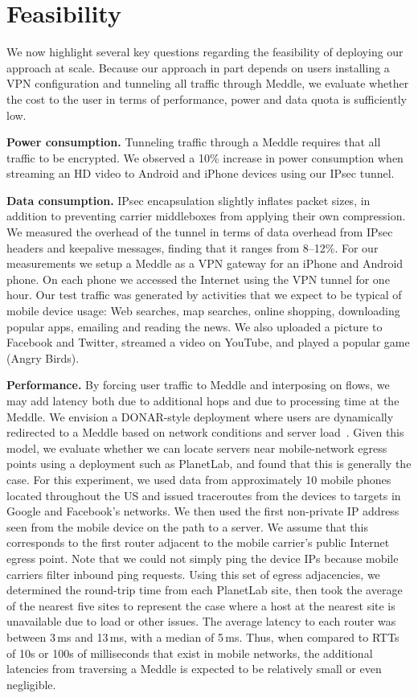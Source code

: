 \documentclass{sig-alternate-10pt}
\newcommand{\meddle}{{Meddle}\xspace}
\begin{document}
\section{Feasibility}
\label{sec:eval}
We now highlight several key questions regarding the feasibility of
deploying our approach at scale. Because our approach in part depends
on users installing a VPN configuration and tunneling all traffic
through \meddle, we evaluate whether the cost to the user in terms
of performance, power and data quota is sufficiently low. 

\noindent\textbf{Power consumption.} Tunneling traffic through a
\meddle requires that all traffic to be encrypted. We observed a 
10\% increase in power consumption when streaming an HD 
video to Android and iPhone devices using our IPsec tunnel. 

\noindent\textbf{Data consumption.} IPsec encapsulation slightly
inflates packet sizes, in addition to preventing carrier middleboxes
from applying their own compression. We measured the overhead of the
tunnel in terms of data overhead from IPsec headers and keepalive
messages, finding that it ranges from 8--12\%. For our measurements we
setup a \meddle as a VPN gateway for an iPhone and Android
phone. On each phone we accessed the Internet using the VPN tunnel for
one hour. Our test traffic was generated by activities that we 
expect to be typical of mobile device usage: Web searches, map
searches, online shopping, downloading popular apps, emailing and
reading the news. We also uploaded a picture to Facebook and Twitter,
streamed a video on YouTube, and played a popular game (Angry Birds).

\noindent\textbf{Performance.} By forcing user traffic to \meddle 
and interposing on flows, we may add latency both due to additional
hops and due to processing time at the \meddle. We envision a
DONAR-style deployment where users are dynamically redirected to a
\meddle based on network conditions and server
load~\cite{wendell:donar}. Given this model, we evaluate whether we
can locate servers near mobile-network egress points using a
deployment such as PlanetLab, and found that this is generally the
case. For this experiment, we used data from approximately 10 mobile
phones located throughout the US and issued traceroutes from the
devices to targets in Google and Facebook's networks. We then used the
first non-private IP address seen from the mobile device on the path
to a server. We assume that this corresponds to the first router
adjacent to the mobile carrier's public Internet egress point. Note
that we could not simply ping the device IPs because mobile carriers
filter inbound ping requests. Using this set of egress adjacencies, we
determined the round-trip time from each PlanetLab site, then took the
average of the nearest five sites to represent the case where a host
at the nearest site is unavailable due to load or other issues. The
average latency to each router was between 3\,ms and 13\,ms, with a
median of 5\,ms. Thus, when compared to RTTs of 10s or 100s of
milliseconds that exist in mobile networks, the additional latencies
from traversing a \meddle is expected to be relatively small or
even negligible.
\end{document}
